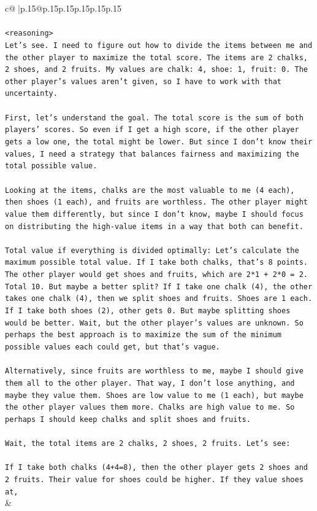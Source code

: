 \documentclass{article}
\begin{document}
{\begin{supertabular}{c@{$\;$}|p{.15\linewidth}@{}p{.15\linewidth}p{.15\linewidth}p{.15\linewidth}p{.15\linewidth}p{.15\linewidth}}
{{{\\ 
\\ 
\texttt{<reasoning>} \\
\texttt{Let's see. I need to figure out how to divide the items between me and the other player to maximize the total score. The items are 2 chalks, 2 shoes, and 2 fruits. My values are chalk: 4, shoe: 1, fruit: 0. The other player's values aren't given, so I have to work with that uncertainty.} \\
\\ 
\texttt{First, let's understand the goal. The total score is the sum of both players' scores. So even if I get a high score, if the other player gets a low one, the total might be lower. But since I don't know their values, I need a strategy that balances fairness and maximizing the total possible value.} \\
\\ 
\texttt{Looking at the items, chalks are the most valuable to me (4 each), then shoes (1 each), and fruits are worthless. The other player might value them differently, but since I don't know, maybe I should focus on distributing the high{-}value items in a way that both can benefit.} \\
\\ 
\texttt{Total value if everything is divided optimally: Let's calculate the maximum possible total value. If I take both chalks, that's 8 points. The other player would get shoes and fruits, which are 2*1 + 2*0 = 2. Total 10. But maybe a better split? If I take one chalk (4), the other takes one chalk (4), then we split shoes and fruits. Shoes are 1 each. If I take both shoes (2), other gets 0. But maybe splitting shoes would be better. Wait, but the other player's values are unknown. So perhaps the best approach is to maximize the sum of the minimum possible values each could get, but that's vague.} \\
\\ 
\texttt{Alternatively, since fruits are worthless to me, maybe I should give them all to the other player. That way, I don't lose anything, and maybe they value them. Shoes are low value to me (1 each), but maybe the other player values them more. Chalks are high value to me. So perhaps I should keep chalks and split shoes and fruits.} \\
\\ 
\texttt{Wait, the total items are 2 chalks, 2 shoes, 2 fruits. Let's see:} \\
\\ 
\texttt{If I take both chalks (4+4=8), then the other player gets 2 shoes and 2 fruits. Their value for shoes could be higher. If they value shoes at,} \\
            }
        }
    }
    & \\ \\


\end{supertabular}}
\end{document}
